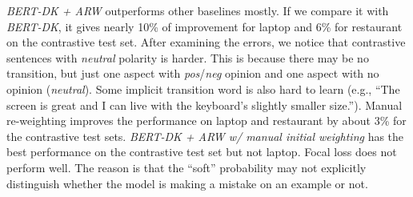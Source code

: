\emph{BERT-DK + ARW} outperforms other baselines mostly. If we compare it with \emph{BERT-DK}, it gives nearly 10\% of improvement for laptop and 6\% for restaurant on the contrastive test set.
After examining the errors, we notice that contrastive sentences with \emph{neutral} polarity is harder. This is because there may be no transition, but just one aspect with \emph{pos}/\emph{neg} opinion and one aspect with no opinion (\emph{neutral}).
Some implicit transition word is also hard to learn (e.g., ``The screen is great and I can live with the keyboard's slightly smaller size.''). 
Manual re-weighting improves the performance on laptop and restaurant by about 3\% for the contrastive test sets.
\emph{BERT-DK + ARW w/ manual initial weighting} has the best performance on the contrastive test set but not laptop.
Focal loss does not perform well. The reason is that the ``soft'' probability may not explicitly distinguish whether the model is making a mistake on an example or not. %
